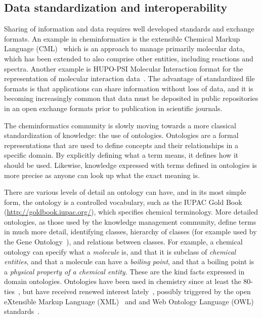 \documentclass[11pt]{book}
\begin{document}
\subsection{Data standardization and interoperability}

Sharing of information and data requires well developed standards and exchange formats.
An example in cheminformatics is the extensible Chemical Markup Language
(CML)~\cite{MurrayRust1999} which
is an approach to manage primarily molecular data, which has been extended to also
comprise other entities, including reactions and spectra. Another example is HUPO-PSI
Molecular Interaction format for the representation of molecular interaction
data~\cite{Orchard:2010uq}. The advantage of standardized file formats is that
applications can share information without loss of data, and it is becoming
increasingly common that data must be deposited in public repositories in an
open exchange formats prior to publication in scientific journals.

The cheminformatics community is slowly moving towards a more classical
standardization of knowledge: the use of ontologies. Ontologies are a formal
representations that are used to define concepts and their relationships in a
specific domain. By explicitly defining what a term means, it defines how
it should be used. Likewise, knowledge expressed with terms defined in
ontologies is more precise as anyone can look up what the exact meaning is.

There are various levels of detail an ontology can have, and in its most
simple form, the ontology is a controlled vocabulary, such as the IUPAC
Gold Book (\url{http://goldbook.iupac.org/}), which specifies chemical terminology.
More detailed ontologies, as those used by the knowledge management community,
define terms in much more detail, identifying classes, hierarchy of classes
(for example used by the Gene Ontology~\cite{GO2008,GO2010}), and relations
between classes. For example, a chemical ontology can specify what a \textit{molecule}
is, and that it is subclass of \textit{chemical entities}, and that a molecule can have
a \textit{boiling point}, and that a boiling point is a \textit{physical property of a chemical
entity}. These are the kind facts expressed in domain ontologies.
Ontologies have been used in chemistry since at least the 80-ties~\cite{Gordon1983},
but have received renewed interest lately~\cite{Feldman2005,Dumontier2009,Sankar2010},
possibly triggered by the open eXtensible Markup Language (XML)~\cite{Bray:08:EML}
and and Web Ontology Language (OWL) standards~\cite{Group:09:OWO}.
\end{document}
